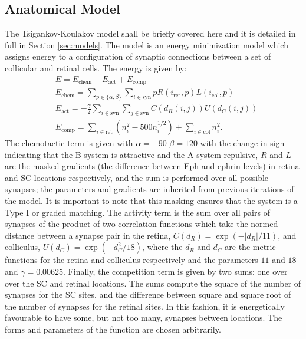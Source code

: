 \subsection{Anatomical Model}
The Tsigankov-Koulakov model shall be briefly covered here and it is detailed in full in Section \ref{sec:models}. The model is an energy minimization model which assigns energy to a configuration of synaptic connections between a set of collicular and retinal cells. The energy is given by:
\begin{align}
&E = E_{\text{chem}} + E_{\text{act}}+E_{\text{comp}}\\	
&E_{\text{chem}} = \sum_{p \in \{\alpha,\beta\}}\sum_{i \in \text{syn}} pR(i_\text{ret},p)L(i_\text{col},p) \\
&E_{\text{act}} =- \frac{\gamma}{2} \sum_{i \in \text{syn}}\sum_{j \in \text{syn}} C(d_R(i, j))U(d_C(i, j)) \label{eq:latticemodelequation}\\
&E_{\text{comp}} = \sum_{i\in \text{ret}} (n_i^2 - 500 n_i^{1/2}) + \sum_{i\in \text{col}} n_i^2.
\end{align}
The chemotactic term is given with $\alpha=-90$ $\beta=120$ with the change in sign indicating that the B system is attractive and the A system repulsive, $R$ and $L$ are the masked gradients (the difference between Eph and ephrin levels) in retina and SC locations respectively, and the sum is performed over all possible synapses; the parameters and gradients are inherited from previous iterations of the model. It is important to note that this masking ensures that the system is a Type I or graded matching. The activity term is the sum over all pairs of synapses of the product of two correlation functions which take the normed distance between a synapse pair in the retina, $C(d_R) = \exp(-|d_R|/11)$, and colliculus, $U(d_C) = \exp(-d_C^2/18)$, where the $d_R$ and $d_C$ are the metric functions for the retina and colliculus respectively and the parameters $11$ and $18$ and $\gamma=0.00625$. Finally, the competition term is given by two sums: one over over the SC and retinal locations. The sums compute the square of the number of synapses for the SC sites, and the difference between square and square root of the number of synapses for the retinal sites. In this fashion, it is energetically favourable to have some, but not too many, synapses between locations. The forms and parameters of the function are chosen arbitrarily.

